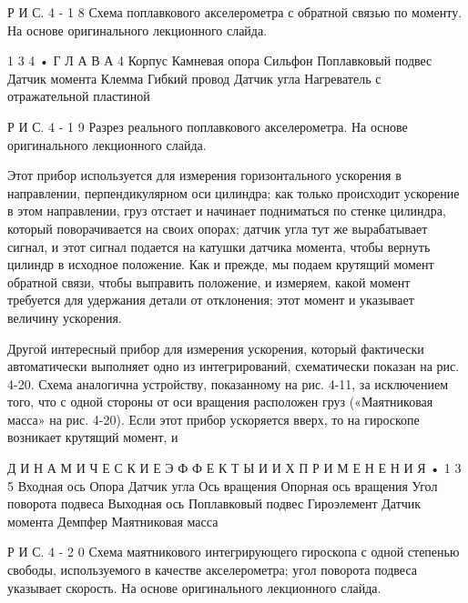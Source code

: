 \documentclass[10pt,oneside]{article}
\begin{document}
Р И С.  4 - 1 8 Схема поплавкового акселерометра с обратной связью по моменту. На основе оригинального лекционного слайда.\par

1 3 4 • Г Л А В А  4 Корпус Камневая опора Сильфон Поплавковый подвес Датчик момента Клемма Гибкий провод Датчик угла Нагреватель с отражательной пластиной\par

Р И С.  4 - 1 9 Разрез реального поплавкового акселерометра. На основе оригинального лекционного слайда.\par

Этот прибор используется для измерения горизонтального ускорения в направлении, перпендикулярном оси цилиндра; как только происходит ускорение в этом направлении, груз отстает и начинает подниматься по стенке цилиндра, который поворачивается на своих опорах; датчик угла тут же вырабатывает сигнал, и этот сигнал подается на катушки датчика момента, чтобы вернуть цилиндр в исходное положение. Как и прежде, мы подаем крутящий момент обратной связи, чтобы выправить положение, и измеряем, какой момент требуется для удержания детали от отклонения; этот момент и указывает величину ускорения.\par

Другой интересный прибор для измерения ускорения, который фактически автоматически выполняет одно из интегрирований, схематически показан на рис. 4-20. Схема аналогична устройству, показанному на рис. 4-11, за исключением того, что с одной стороны от оси вращения расположен груз («Маятниковая масса» на рис. 4-20). Если этот прибор ускоряется вверх, то на гироскопе возникает крутящий момент, и\par

Д И Н А М И Ч Е С К И Е  Э Ф Ф Е К Т Ы  И  И Х  П Р И М Е Н Е Н И Я • 1 3 5 Входная ось Опора Датчик угла Ось вращения Опорная ось вращения Угол поворота подвеса Выходная ось Поплавковый подвес Гироэлемент Датчик момента Демпфер Маятниковая масса\par

Р И С.  4 - 2 0 Схема маятникового интегрирующего гироскопа с одной степенью свободы, используемого в качестве акселерометра; угол поворота подвеса указывает скорость. На основе оригинального лекционного слайда.\par
\end{document}

